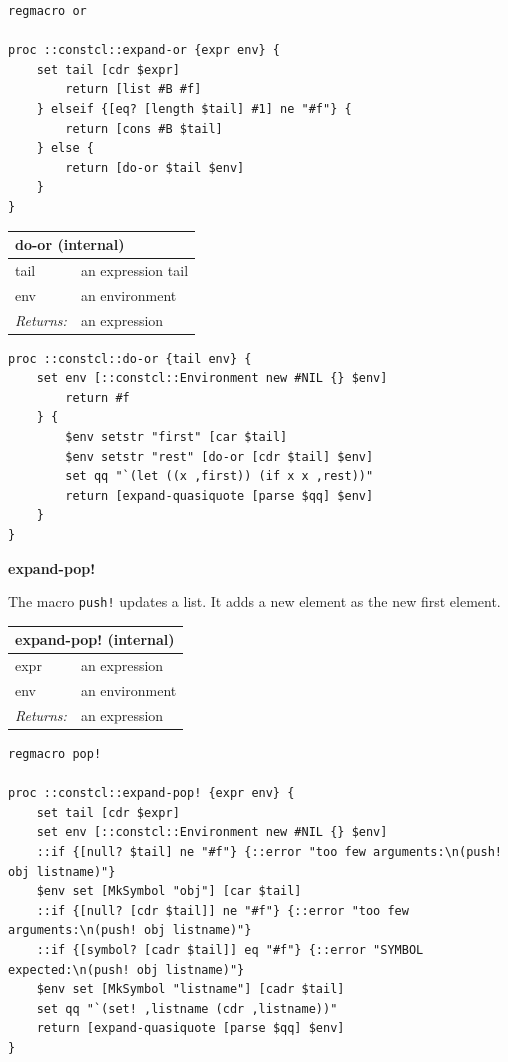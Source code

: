 \documentclass[twoside,9pt]{report}
\begin{document}
\noindent\makebox[\linewidth]{\rule{\linewidth}{0.4pt}}
\begin{lstlisting}
regmacro or
 
proc ::constcl::expand-or {expr env} {
    set tail [cdr $expr]
        return [list #B #f]
    } elseif {[eq? [length $tail] #1] ne "#f"} {
        return [cons #B $tail]
    } else {
        return [do-or $tail $env]
    }
}
\end{lstlisting}
\noindent\makebox[\linewidth]{\rule{\linewidth}{0.4pt}}
\begin{tabular}{ |l l| }
\hline
\multicolumn{2}{|l|}{do-or (internal)} \\
\hline
tail & an expression tail \\
env & an environment \\
\textit{Returns:} & an expression \\
\hline
\end{tabular}

\noindent\makebox[\linewidth]{\rule{\linewidth}{0.4pt}}
\begin{lstlisting}
proc ::constcl::do-or {tail env} {
    set env [::constcl::Environment new #NIL {} $env]
        return #f
    } {
        $env setstr "first" [car $tail]
        $env setstr "rest" [do-or [cdr $tail] $env]
        set qq "`(let ((x ,first)) (if x x ,rest))"
        return [expand-quasiquote [parse $qq] $env]
    }
}
\end{lstlisting}
\noindent\makebox[\linewidth]{\rule{\linewidth}{0.4pt}}

\textbf{expand-pop!}


The macro \texttt{push!} updates a list. It adds a new element as the new first element.

\begin{tabular}{ |l l| }
\hline
\multicolumn{2}{|l|}{expand-pop! (internal)} \\
\hline
expr & an expression \\
env & an environment \\
\textit{Returns:} & an expression \\
\hline
\end{tabular}

\noindent\makebox[\linewidth]{\rule{\linewidth}{0.4pt}}
\begin{lstlisting}
regmacro pop!
 
proc ::constcl::expand-pop! {expr env} {
    set tail [cdr $expr]
    set env [::constcl::Environment new #NIL {} $env]
    ::if {[null? $tail] ne "#f"} {::error "too few arguments:\n(push! obj listname)"}
    $env set [MkSymbol "obj"] [car $tail]
    ::if {[null? [cdr $tail]] ne "#f"} {::error "too few arguments:\n(push! obj listname)"}
    ::if {[symbol? [cadr $tail]] eq "#f"} {::error "SYMBOL expected:\n(push! obj listname)"}
    $env set [MkSymbol "listname"] [cadr $tail]
    set qq "`(set! ,listname (cdr ,listname))"
    return [expand-quasiquote [parse $qq] $env]
}
\end{lstlisting}
\noindent\makebox[\linewidth]{\rule{\linewidth}{0.4pt}}
\end{document}
